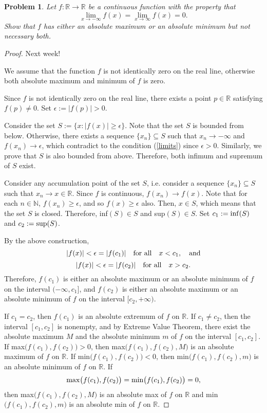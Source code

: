 \documentclass[11pt]{article}
\theoremstyle{plain}
\newtheorem{problem}{Problem}
\theoremstyle{remark}
\newcommand {\mbR} {\mathbb R}
\newcommand {\mbN} {\mathbb N}
\begin{document}
\begin{problem}
	Let $f:\mbR \to \mbR$ be a continuous function with the property that 
	\begin{equation}
	\label{limits}
	\lim_{x\to -\infty} f(x) = \lim_{x\to \infty} f(x) = 0.
	\end{equation}
	Show that $f$ has either an absolute maximum or an absolute minimum but not necessary both.
\end{problem}



\begin{proof}
	
	Next week!
	
	\iffalse
	We assume that the function $f$ is not identically zero on the real line, otherwise both absolute maximum and minimum of $f$ is zero.
	
	Since $f$ is not identically zero on the real line, there exists a point $p \in \mathbb{R}$ satisfying $f(p) \neq 0$. Set $\epsilon:= |f(p)|>0$. 
	
	Consider the set $S:=\{x: |f(x)| \geq \epsilon \}$. Note that the set $S$ is bounded from below. Otherwise, there exists a sequence $\{x_n\} \subseteq S$ such that $x_n \to -\infty$ and $f(x_n) \to \epsilon$, which contradict to the condition (\ref{limits}) since $\epsilon>0$. Similarly, we prove that $S$ is also bounded from above. Therefore, both infimum and supremum of $S$ exist. 
	
	Consider any accumulation point of the set $S$, i.e. consider a sequence 
	$\{x_n\} \subseteq S$ such that $x_n \to x \in \mbR$. Since $f$ is continuous, $f(x_n) \to f(x)$. Note that for each $n \in \mbN$, $f(x_n) \geq \epsilon$, and so $f(x) \geq \epsilon$ also. Then, $x \in S$, which means that the set $S$ is closed. Therefore, inf$(S) \in S$ and sup$(S) \in S$.
	Set $c_1:= {\rm inf}(S)$ and $c_2:= {\rm sup}(S)$.
	
	By the above construction, 
	$$
	|f(x)|<\epsilon = |f(c_1)| \quad {\rm for} \ {\rm all} \quad x<c_1, \quad {\rm and}
	$$
	$$
	|f(x)|<\epsilon = |f(c_2)| \quad {\rm for} \ {\rm all} \quad x>c_2.
	$$
	Therefore, $f(c_1)$ is either an absolute maximum or an absolute minimum of $f$ on the interval $(-\infty, c_1]$, and $f(c_2)$ is either an absolute maximum or an absolute minimum of $f$ on the interval 
	$[c_2, +\infty)$.
	
	If $c_1 = c_2$, then $f(c_1)$ is an absolute extremum of $f$ on $\mbR$. If $c_1 \neq c_2$, then the interval $[c_1,c_2]$ is nonempty, and by Extreme Value Theorem, there exist the absolute maximum $M$ and the absolute minimum $m$ of $f$ on the interval $[c_1, c_2]$. 
	If max$\big(f(c_1),f(c_2)\big)>0$, then max$\big(f(c_1),f(c_2), M\big)$ is an absolute maximum of $f$ on $\mbR$. If min$\big(f(c_1),f(c_2)\big)<0$, then min$\big(f(c_1),f(c_2), m\big)$ is an absolute minimum of $f$ on $\mbR$. If 
	$$
	{\rm max} \big(f(c_1),f(c_2)\big)= {\rm min} \big(f(c_1),f(c_2)\big)=0,
	$$ then max$\big(f(c_1),f(c_2), M\big)$ is an absolute max of $f$ on $\mbR$ and min$\big(f(c_1),f(c_2), m\big)$ is an absolute min of $f$ on $\mbR$.
	

\end{proof}
\end{document}
